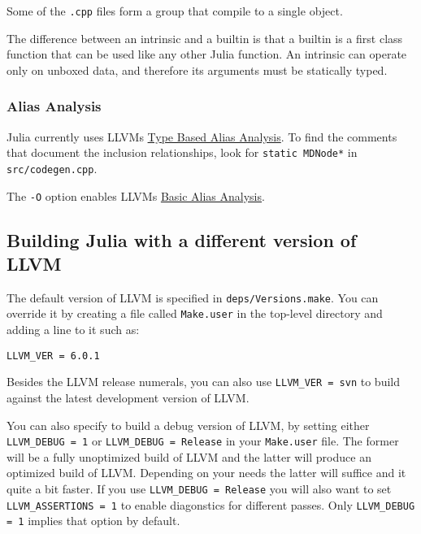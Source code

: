 Some of the \texttt{.cpp} files form a group that compile to a single object.



The difference between an intrinsic and a builtin is that a builtin is a first class function that can be used like any other Julia function.  An intrinsic can operate only on unboxed data, and therefore its arguments must be statically typed.



\hypertarget{8366324567299313031}{}


\subsubsection{Alias Analysis}



Julia currently uses LLVM{\textquotesingle}s \href{http://llvm.org/docs/LangRef.html\#tbaa-metadata}{Type Based Alias Analysis}. To find the comments that document the inclusion relationships, look for \texttt{static MDNode*} in \texttt{src/codegen.cpp}.



The \texttt{-O} option enables LLVM{\textquotesingle}s \href{http://llvm.org/docs/AliasAnalysis.html\#the-basicaa-pass}{Basic Alias Analysis}.



\hypertarget{13120458447023898074}{}


\subsection{Building Julia with a different version of LLVM}



The default version of LLVM is specified in \texttt{deps/Versions.make}. You can override it by creating a file called \texttt{Make.user} in the top-level directory and adding a line to it such as:




\begin{lstlisting}
LLVM_VER = 6.0.1
\end{lstlisting}



Besides the LLVM release numerals, you can also use \texttt{LLVM\_VER = svn} to build against the latest development version of LLVM.



You can also specify to build a debug version of LLVM, by setting either \texttt{LLVM\_DEBUG = 1} or \texttt{LLVM\_DEBUG = Release} in your \texttt{Make.user} file. The former will be a fully unoptimized build of LLVM and the latter will produce an optimized build of LLVM. Depending on your needs the latter will suffice and it quite a bit faster. If you use \texttt{LLVM\_DEBUG = Release} you will also want to set \texttt{LLVM\_ASSERTIONS = 1} to enable diagonstics for different passes. Only \texttt{LLVM\_DEBUG = 1} implies that option by default.




